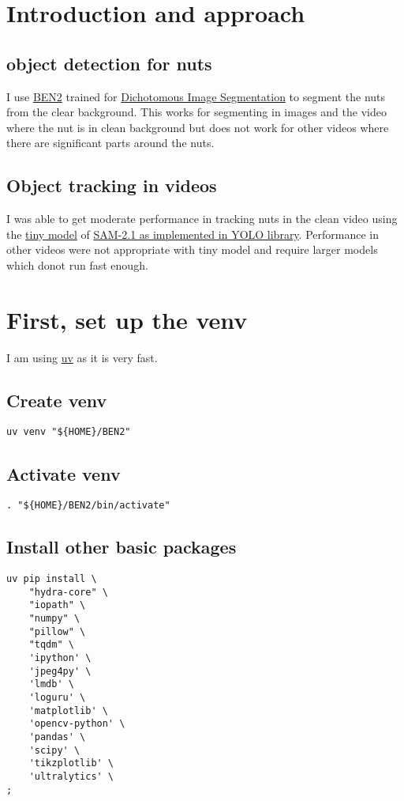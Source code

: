 \documentclass[11pt]{article}
\date{\today}
\title{}
\begin{document}
\tableofcontents

\section{Introduction and approach}
\label{sec:org63ff334}

\subsection{object detection for nuts}
\label{sec:org48ecb25}
I use \href{https://github.com/PramaLLC/BEN2}{BEN2} trained for \href{https://paperswithcode.com/dataset/dis5k}{Dichotomous Image Segmentation} to segment the nuts from the clear background.
This works for segmenting in images and the video where the nut is in clean background
but does not work for other videos where there are significant parts around the nuts.
\subsection{Object tracking in videos}
\label{sec:org52f2fef}
I was able to get moderate performance in tracking nuts in the clean video using the
\href{https://github.com/ultralytics/assets/releases/download/v8.3.0/sam2\_t.pt}{tiny model} of \href{https://docs.ultralytics.com/models/sam-2/}{SAM-2.1 as implemented in YOLO library}.
Performance in other videos were not appropriate with tiny model and require larger models
which donot run fast enough.
\section{First, set up the venv}
\label{sec:orgfaf5d57}
I am using \href{https://github.com/astral-sh/uv}{uv} as it is very fast.
\subsection{Create venv}
\label{sec:org7da2084}
\begin{verbatim}
uv venv "${HOME}/BEN2"
\end{verbatim}
\subsection{Activate venv}
\label{sec:orge0f9de0}
\begin{verbatim}
. "${HOME}/BEN2/bin/activate"
\end{verbatim}
\subsection{Install other basic packages}
\label{sec:orgef8afae}
\begin{verbatim}
uv pip install \
    "hydra-core" \
    "iopath" \
    "numpy" \
    "pillow" \
    "tqdm" \
    'ipython' \
    'jpeg4py' \
    'lmdb' \
    'loguru' \
    'matplotlib' \
    'opencv-python' \
    'pandas' \
    'scipy' \
    'tikzplotlib' \
    'ultralytics' \
;
\end{verbatim}
\end{document}

